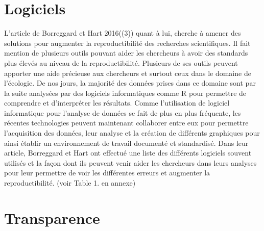 \documentclass[9pt,twocolumn,twoside,]{pnas-new}
\begin{document}
\hypertarget{logiciels}{%
\section{Logiciels}\label{logiciels}}

L'article de Borreggard et Hart 2016((3)) quant à lui, cherche à amener
des solutions pour augmenter la reproductibilité des recherches
scientifiques. Il fait mention de plusieurs outils pouvant aider les
chercheurs à avoir des standards plus élevés au niveau de la
reproductibilité. Plusieurs de ses outils peuvent apporter une aide
précieuse aux chercheurs et surtout ceux dans le domaine de l'écologie.
De nos jours, la majorité des données prises dans ce domaine sont par la
suite analysées par des logiciels informatiques comme R pour permettre
de comprendre et d'interpréter les résultats. Comme l'utilisation de
logiciel informatique pour l'analyse de données se fait de plus en plus
fréquente, les récentes technologies peuvent maintenant collaborer entre
eux pour permettre l'acquisition des données, leur analyse et la
création de différents graphiques pour ainsi établir un environnement de
travail documenté et standardisé. Dans leur article, Borreggard et Hart
ont effectué une liste des différents logiciels souvent utilisés et la
façon dont ils peuvent venir aider les chercheurs dans leurs analyses
pour leur permettre de voir les différentes erreurs et augmenter la
reproductibilité. (voir Table 1. en annexe)

\hypertarget{transparence}{%
\section{Transparence}\label{transparence}}
\end{document}
